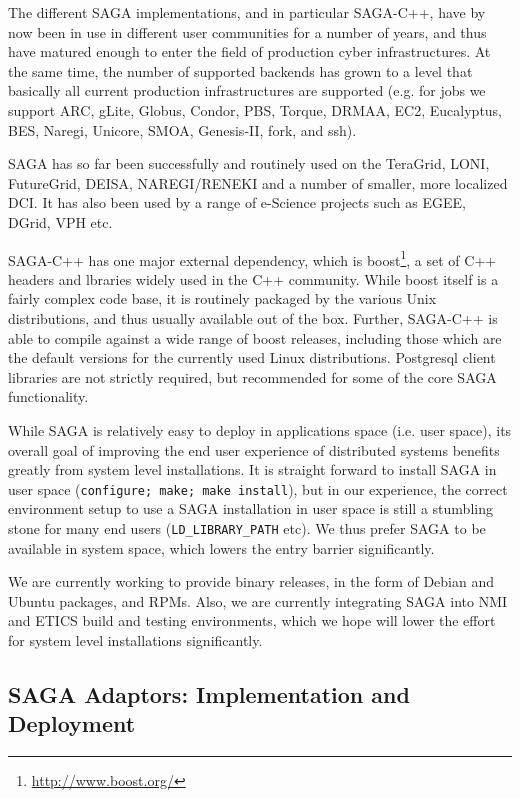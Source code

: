 \documentclass[12pt]{article}
\newcommand{\T}[1]{\texttt{#1}}
\begin{document}
  The different SAGA implementations, and in particular SAGA-C++, have
  by now been in use in different user communities for a number of
  years, and thus have matured enough to enter the  field of
  production cyber infrastructures.  At the same time, the number of
  supported backends has grown to a level that basically all current
  production infrastructures are supported (e.g. for jobs we support
  ARC, gLite, Globus, Condor, PBS, Torque, DRMAA, EC2, Eucalyptus,
  BES,  Naregi, Unicore, SMOA, Genesis-II, fork, and ssh).  

  SAGA has so far been successfully and routinely used on the
  TeraGrid, LONI, FutureGrid, DEISA, NAREGI/RENEKI and a number of
  smaller, more localized DCI. It has also been used by a range of
  e-Science projects such as EGEE, DGrid, VPH etc.

  SAGA-C++ has one major external dependency, which is
  boost\footnote{\url{http://www.boost.org/}}, a set of C++ headers
  and lbraries widely used in the C++ community.  While boost itself
  is a fairly complex code base, it is routinely packaged by the
  various Unix distributions, and thus usually available out of the
  box.  Further, SAGA-C++ is able to compile against a wide range of
  boost releases, including those which are the default versions for
  the currently used Linux distributions.  Postgresql client libraries
  are not strictly required, but recommended for some of the core SAGA
  functionality.

  While SAGA is relatively easy to deploy in applications space (i.e.
  user space), its overall goal of improving the end user experience
  of distributed systems benefits greatly from system level
  installations.  It is straight forward to install SAGA in user space
  (\T{configure; make; make install}), but in our experience, the
  correct environment setup to use a SAGA installation in user space
  is still a stumbling stone for many end users (\T{LD\_LIBRARY\_PATH}
  etc).  We thus prefer SAGA to be available in system space, which
  lowers the entry barrier significantly.  

  We are currently working to provide binary releases, in the form of
  Debian and Ubuntu packages, and RPMs.  Also, we are currently
  integrating SAGA into NMI and ETICS build and testing environments,
  which we hope will lower the effort for system level installations
  significantly.


  \subsection{SAGA Adaptors: Implementation and Deployment}
\end{document}
